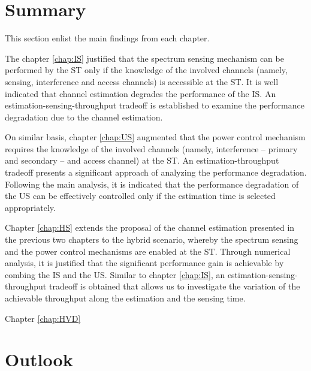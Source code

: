\section{Summary}

This section enlist the main findings from each chapter. 

The chapter \ref{chap:IS} justified that the spectrum sensing mechanism can be performed by the ST only if the knowledge of the involved channels (namely, sensing, interference and access channels) is accessible at the ST. It is well indicated that channel estimation degrades the performance of the IS. An estimation-sensing-throughput tradeoff is established to examine the performance degradation due to the channel estimation.

On similar basis, chapter \ref{chap:US} augmented that the power control mechanism requires the knowledge of the involved channels (namely, interference -- primary and secondary -- and access channel) at the ST. An estimation-throughput tradeoff presents a significant approach of analyzing the performance degradation. Following the main analysis, it is indicated that the performance degradation of the US can be effectively controlled only if the estimation time is selected appropriately.   

Chapter \ref{chap:HS} extends the proposal of the channel estimation presented in the previous two chapters to the hybrid scenario, whereby the spectrum sensing and the power control mechanisms are enabled at the ST. Through numerical analysis, it is justified that the significant performance gain is achievable by combing the IS and the US. Similar to chapter \ref{chap:IS}, an estimation-sensing-throughput tradeoff is obtained that allows us to investigate the variation of the achievable throughput along the estimation and the sensing time. 

Chapter \ref{chap:HVD}


\section{Outlook}










